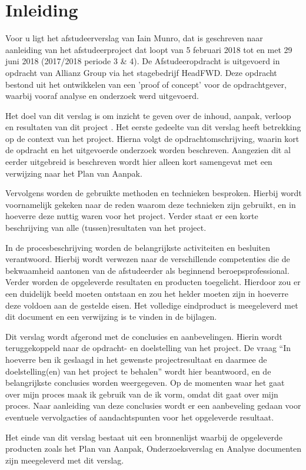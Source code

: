 \chapter{Inleiding}
Voor u ligt het afstudeerverslag van Iain Munro, dat is geschreven naar aanleiding van het afstudeerproject dat loopt van 5 februari 2018 tot en met 29 juni 2018 (2017/2018 periode 3 \& 4). De Afstudeeropdracht is uitgevoerd in opdracht van Allianz Group via het stagebedrijf HeadFWD. Deze opdracht bestond uit het ontwikkelen van een ’proof of concept’ voor de opdrachtgever, waarbij vooraf analyse en onderzoek werd uitgevoerd.
\par 
Het doel van dit verslag is om inzicht te geven over de inhoud, aanpak, verloop en resultaten van dit project \cite{afTut}. Het eerste gedeelte van dit verslag heeft betrekking op de context van het project. Hierna volgt de opdrachtomschrijving, waarin kort de opdracht en het uitgevoerde onderzoek worden beschreven. Aangezien dit al eerder uitgebreid is beschreven wordt hier alleen kort samengevat met een verwijzing naar het Plan van Aanpak.
\par
Vervolgens worden de gebruikte methoden en technieken besproken. Hierbij wordt voornamelijk gekeken naar de reden waarom deze technieken zijn gebruikt, en in hoeverre deze nuttig waren voor het project. Verder staat er een korte beschrijving van alle (tussen)resultaten van het project.
\par
In de procesbeschrijving worden de belangrijkste activiteiten en besluiten verantwoord. Hierbij wordt verwezen naar de verschillende competenties \cite{studiegids} die de bekwaamheid aantonen van de afstudeerder als beginnend beroepsprofessional. Verder worden de opgeleverde resultaten en producten toegelicht. Hierdoor zou er een duidelijk beeld moeten ontstaan en zou het helder moeten zijn in hoeverre deze voldoen aan de gestelde eisen. Het volledige eindproduct is meegeleverd met dit document en een verwijzing is te vinden in de bijlagen.
\par
Dit verslag wordt afgerond met de conclusies en aanbevelingen. Hierin wordt teruggekoppeld naar de opdracht- en doelstelling van het project. De vraag “In hoeverre ben ik geslaagd in het gewenste projectresultaat en daarmee de doelstelling(en) van het project te behalen” wordt hier beantwoord, en de belangrijkste conclusies worden weergegeven. Op de momenten waar het gaat over mijn proces maak ik gebruik van de ik vorm, omdat dit gaat over mijn proces. Naar aanleiding van deze conclusies wordt er een aanbeveling gedaan voor eventuele vervolgacties of aandachtspunten voor het opgeleverde resultaat.
\par
Het einde van dit verslag bestaat uit een bronnenlijst waarbij de opgeleverde producten zoals het Plan van Aanpak, Onderzoeksverslag en Analyse documenten zijn meegeleverd met dit verslag. 

